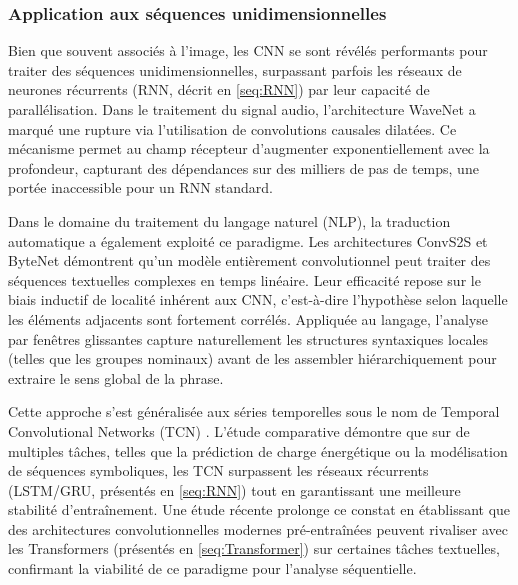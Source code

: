 \subsubsection{Application aux séquences unidimensionnelles}
Bien que souvent associés à l'image, les CNN se sont révélés performants pour traiter des séquences unidimensionnelles, surpassant parfois les réseaux de neurones récurrents (RNN, décrit en \ref{seq:RNN}) par leur capacité de parallélisation. Dans le traitement du signal audio, l'architecture WaveNet \cite{van_den_oord_wavenet_2016} a marqué une rupture via l'utilisation de convolutions causales dilatées. Ce mécanisme permet au champ récepteur d'augmenter exponentiellement avec la profondeur, capturant des dépendances sur des milliers de pas de temps, une portée inaccessible pour un RNN standard.

Dans le domaine du traitement du langage naturel (NLP), la traduction automatique a également exploité ce paradigme. Les architectures ConvS2S \cite{gehring_convolutional_2017} et ByteNet \cite{kalchbrenner_neural_2017} démontrent qu'un modèle entièrement convolutionnel peut traiter des séquences textuelles complexes en temps linéaire. Leur efficacité repose sur le biais inductif de localité inhérent aux CNN, c'est-à-dire l'hypothèse selon laquelle les éléments adjacents sont fortement corrélés. Appliquée au langage, l'analyse par fenêtres glissantes capture naturellement les structures syntaxiques locales (telles que les groupes nominaux) avant de les assembler hiérarchiquement pour extraire le sens global de la phrase.

Cette approche s'est généralisée aux séries temporelles sous le nom de Temporal Convolutional Networks (TCN) \cite{bai_empirical_2018}. L'étude comparative démontre que sur de multiples tâches, telles que la prédiction de charge énergétique ou la modélisation de séquences symboliques, les TCN surpassent les réseaux récurrents (LSTM/GRU, présentés en \ref{seq:RNN}) tout en garantissant une meilleure stabilité d'entraînement. Une étude récente \cite{tay_are_2022} prolonge ce constat en établissant que des architectures convolutionnelles modernes pré-entraînées peuvent rivaliser avec les Transformers (présentés en \ref{seq:Transformer})  sur certaines tâches textuelles, confirmant la viabilité de ce paradigme pour l'analyse séquentielle.

